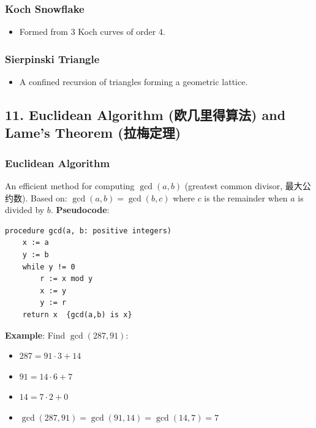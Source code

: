 \documentclass[10pt,a4paper,openany]{ctexbook}
\theoremstyle{definition}
\theoremstyle{remark}
\begin{document}
\subsubsection{Koch Snowflake}

\begin{itemize}
\item Formed from 3 Koch curves of order 4.

\end{itemize}

\subsubsection{Sierpinski Triangle}

\begin{itemize}
\item A confined recursion of triangles forming a geometric lattice.

\end{itemize}

\vspace{-2pt}

\subsection{11. Euclidean Algorithm (欧几里得算法) and Lame's Theorem (拉梅定理)}

\subsubsection{Euclidean Algorithm}

An efficient method for computing $\gcd(a, b)$ (greatest common divisor, 最大公约数).
Based on: $\gcd(a, b) = \gcd(b, c)$ where $c$ is the remainder when $a$ is divided by $b$.
\textbf{Pseudocode}:
{\footnotesize\begin{verbatim}
procedure gcd(a, b: positive integers)
    x := a
    y := b
    while y != 0
        r := x mod y
        x := y
        y := r
    return x  {gcd(a,b) is x}
\end{verbatim}}

\textbf{Example}: Find $\gcd(287, 91)$:
\begin{itemize}
\item $287 = 91 \cdot 3 + 14$
\item $91 = 14 \cdot 6 + 7$
\item $14 = 7 \cdot 2 + 0$
\item $\gcd(287, 91) = \gcd(91, 14) = \gcd(14, 7) = 7$

\end{itemize}
\end{document}

